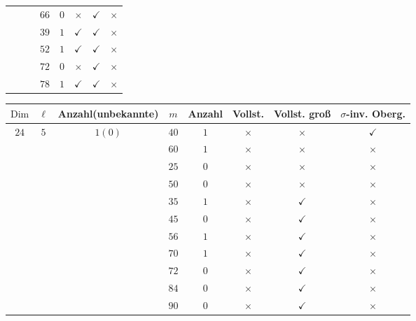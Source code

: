 \documentclass[12pt,a4paper,halfparskip,headsepline,bibtotocnumbered]{scrreprt}
\theoremstyle{nummermitklammern}
\theoremstyle{nonumberbreak}
\newcommand{\Dim}{\text{Dim}}
\begin{document}
\begin{table}[H]
\begin{tabular}{|c|c|c|c|c|c|c|c|}
								&						&							&$66$	&$0$	&$\times$		&$\checkmark$	&$\times$\\ \cline{4-8}
								&						&							&$39$	&$1$	&$\checkmark$	&$\checkmark$	&$\times$\\ \cline{4-8}
								&						&							&$52$	&$1$	&$\checkmark$	&$\checkmark$	&$\times$\\ \cline{4-8}
								&						&							&$72$	&$0$	&$\times$		&$\checkmark$	&$\times$\\ \cline{4-8}
								&						&							&$78$	&$1$	&$\checkmark$	&$\checkmark$	&$\times$\\ \hline
	\end{tabular}
\end{table}

\begin{table}[H]
	\centering
	\begin{tabular}{|c|c|c|c|c|c|c|c|}
		\hline		
		$\Dim$					&$\ell$					&{Anzahl(unbekannte)}		&$m$	&Anzahl	&Vollst.	&Vollst. groß	&$\sigma$-inv. Oberg.\\ \hline
		\multirow{11}{*}{$24$}	&\multirow{11}{*}{$5$}	&\multirow{11}{*}{$1(0)$}	&$40$	&$1$	&$\times$		&$\times$		&$\checkmark$\\ \cline{4-8}
								&						&							&$60$	&$1$	&$\times$		&$\times$		&$\times$\\ \cline{4-8}
								&						&							&$25$	&$0$	&$\times$		&$\times$		&$\times$\\ \cline{4-8}
								&						&							&$50$	&$0$	&$\times$		&$\times$		&$\times$\\ \cline{4-8}
								&						&							&$35$	&$1$	&$\times$		&$\checkmark$	&$\times$\\ \cline{4-8}
								&						&							&$45$	&$0$	&$\times$		&$\checkmark$	&$\times$\\ \cline{4-8}
								&						&							&$56$	&$1$	&$\times$		&$\checkmark$	&$\times$\\ \cline{4-8}
								&						&							&$70$	&$1$	&$\times$		&$\checkmark$	&$\times$\\ \cline{4-8}
								&						&							&$72$	&$0$	&$\times$		&$\checkmark$	&$\times$\\ \cline{4-8}
								&						&							&$84$	&$0$	&$\times$		&$\checkmark$	&$\times$\\ \cline{4-8}
								&						&							&$90$	&$0$	&$\times$		&$\checkmark$	&$\times$\\ \hline
	\end{tabular}
\end{table}
\end{document}
